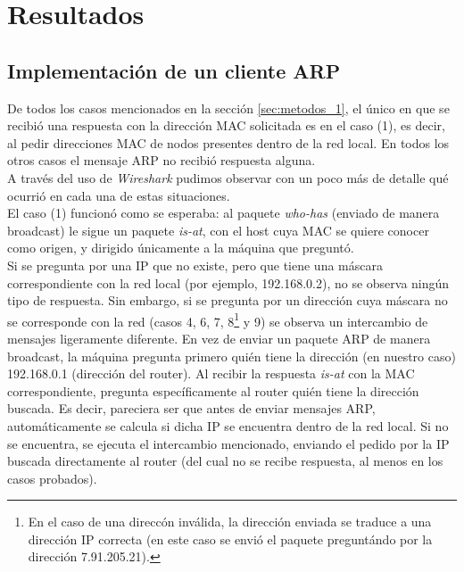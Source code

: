 \section{Resultados}

\subsection{Implementaci\'on de un cliente ARP}

De todos los casos mencionados en la secci\'on \ref{sec:metodos_1}, el \'unico en que se recibi\'o una respuesta con la direcci\'on MAC solicitada es en el caso (1), es decir, al pedir direcciones MAC de nodos presentes dentro de la red local. En todos los otros casos el mensaje ARP no recibi\'o respuesta alguna.\\

A trav\'es del uso de \emph{Wireshark} pudimos observar con un poco m\'as de detalle qu\'e ocurri\'o en cada una de estas situaciones.\\

El caso (1) funcion\'o como se esperaba: al paquete \emph{who-has} (enviado de manera broadcast) le sigue un paquete \emph{is-at}, con el host cuya MAC se quiere conocer como origen, y dirigido \'unicamente a la m\'aquina que pregunt\'o.\\

Si se pregunta por una IP que no existe, pero que tiene una m\'ascara correspondiente con la red local (por ejemplo, 192.168.0.2), no se observa ning\'un tipo de respuesta. Sin embargo, si se pregunta por un direcci\'on cuya m\'ascara no se corresponde con la red (casos 4, 6, 7, 8\footnote{En el caso de una direcc\'on inv\'alida, la direcci\'on enviada se traduce a una direcci\'on IP correcta (en este caso se envi\'o el paquete pregunt\'ando por la direcci\'on 7.91.205.21).} y 9) se observa un intercambio de mensajes ligeramente diferente. En vez de enviar un paquete ARP de manera broadcast, la m\'aquina pregunta primero qui\'en tiene la direcci\'on (en nuestro caso) 192.168.0.1 (direcci\'on del router). Al recibir la respuesta \emph{is-at} con la MAC correspondiente, pregunta espec\'ificamente al router qui\'en tiene la direcci\'on buscada. Es decir, pareciera ser que antes de enviar mensajes ARP, autom\'aticamente se calcula si dicha IP se encuentra dentro de la red local. Si no se encuentra, se ejecuta el intercambio mencionado, enviando el pedido por la IP buscada directamente al router (del cual no se recibe respuesta, al menos en los casos probados).\\

